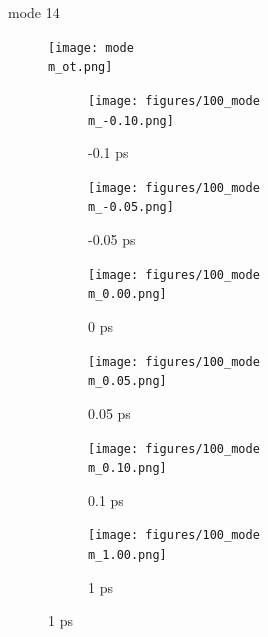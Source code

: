 \documentclass{beamer}
\newcommand\w{0.32}
\begin{document}
\renewcommand\m{14}
\begin{frame}{mode \m}
		\vspace{\vh mm}
	\begin{figure}
		\centering
		\texttt{[image: mode\\m\_ot.png]}
	\end{figure}
	\begin{figure}
		\centering
		\begin{subfigure}[b]{\w\textwidth}
			\centering
			\texttt{[image: figures/100\_mode\\m\_-0.10.png]}
			\caption{-0.1 ps}
		\end{subfigure}
		\begin{subfigure}[b]{\w\textwidth}
			\centering
			\texttt{[image: figures/100\_mode\\m\_-0.05.png]}
			\caption{-0.05 ps}
		\end{subfigure}
		\begin{subfigure}[b]{\w\textwidth}
			\centering
			\texttt{[image: figures/100\_mode\\m\_0.00.png]}
			\caption{0 ps}
		\end{subfigure}
		\begin{subfigure}[b]{\w\textwidth}
			\centering
			\texttt{[image: figures/100\_mode\\m\_0.05.png]}
			\caption{0.05 ps}
		\end{subfigure}
		\begin{subfigure}[b]{\w\textwidth}
			\centering
			\texttt{[image: figures/100\_mode\\m\_0.10.png]}
			\caption{0.1 ps}
		\end{subfigure}
		\begin{subfigure}[b]{\w\textwidth}
			\centering
			\texttt{[image: figures/100\_mode\\m\_1.00.png]}
			\caption{1 ps}
		\end{subfigure}
	\end{figure}
\end{frame}
\end{document}
